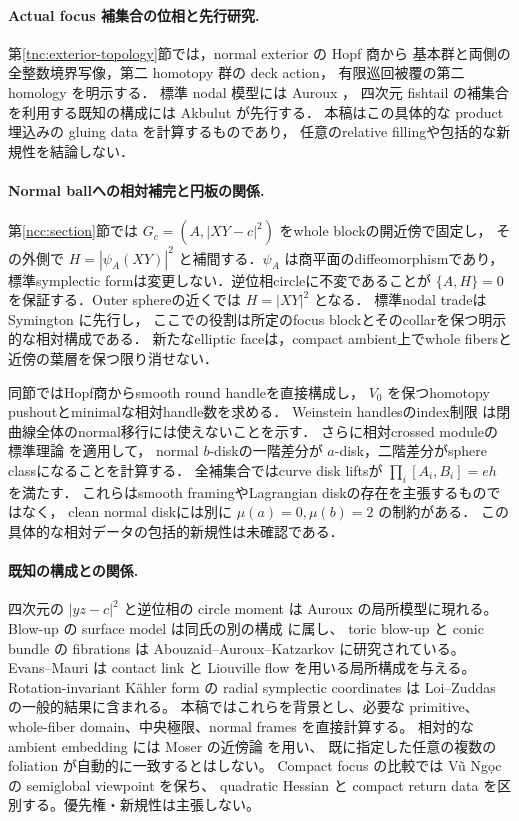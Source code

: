 \documentclass[11pt,a4paper]{article}
\theoremstyle{definition}
\begin{document}
\paragraph{Actual focus 補集合の位相と先行研究.}
第\ref{tnc:exterior-topology}節では，normal exterior の Hopf 商から
基本群と両側の全整数境界写像，第二 homotopy 群の deck action，
有限巡回被覆の第二 homology を明示する．
標準 nodal 模型には Auroux \cite[Section~5.1]{auroux-local}，
四次元 fishtail の補集合を利用する既知の構成には
Akbulut \cite[Introduction]{akbulut-double-fishtail}が先行する．
本稿はこの具体的な product 埋込みの gluing data を計算するものであり，
任意のrelative fillingや包括的な新規性を結論しない．

\paragraph{Normal ballへの相対補完と円板の関係.}
第\ref{ncc:section}節では $G_c=(A,|XY-c|^2)$ をwhole blockの開近傍で固定し，
その外側で $H=|\psi_A(XY)|^2$ と補間する．$\psi_A$ は商平面のdiffeomorphismであり，
標準symplectic formは変更しない．逆位相circleに不変であることが
$\{A,H\}=0$ を保証する．Outer sphereの近くでは $H=|XY|^2$ となる．
標準nodal tradeはSymington \cite[Section~6.1]{symington}に先行し，
ここでの役割は所定のfocus blockとそのcollarを保つ明示的な相対構成である．
新たなelliptic faceは，compact ambient上でwhole fibersと近傍の葉層を保つ限り消せない．

同節ではHopf商からsmooth round handleを直接構成し，
$V_0$ を保つhomotopy pushoutとminimalな相対handle数を求める．
Weinstein handlesのindex制限 \cite[Section~1.1]{cieliebak-eliashberg-flexible-local}
は閉曲線全体のnormal移行には使えないことを示す．
さらに相対crossed moduleの標準理論 \cite[Section~2]{brown-relative-pi2}を適用して，
normal $b$-diskの一階差分が $a$-disk，二階差分がsphere classになることを計算する．
全補集合ではcurve disk liftsが $\prod_i[A_i,B_i]=eh$ を満たす．
これらはsmooth framingやLagrangian diskの存在を主張するものではなく，
clean normal diskには別に $\mu(a)=0,\mu(b)=2$ の制約がある．
この具体的な相対データの包括的新規性は未確認である．

\paragraph{既知の構成との関係.}
四次元の $|yz-c|^2$ と逆位相の circle moment は
Auroux \cite[\S5.1]{auroux-local} の局所模型に現れる。
Blow-up の surface model は同氏の別の構成 \cite[\S3.1.2]{auroux-blowup} に属し、
toric blow-up と conic bundle の fibrations は Abouzaid--Auroux--Katzarkov \cite{aak} に研究されている。
Evans--Mauri \cite{em} は contact link と Liouville flow を用いる局所構成を与える。
Rotation-invariant Kähler form の radial symplectic coordinates は
Loi--Zuddas \cite[Theorem 1.1]{loi-zuddas-local} の一般的結果に含まれる。
本稿ではこれらを背景とし、必要な primitive、whole-fiber domain、中央極限、normal frames を直接計算する。
相対的な ambient embedding には Moser の近傍論 \cite[\S7.3]{cds-local} を用い、
既に指定した任意の複数の foliation が自動的に一致するとはしない。
Compact focus の比較では V\~u Ng\d{o}c \cite{vungoc-local} の semiglobal viewpoint を保ち、
quadratic Hessian と compact return data を区別する。優先権・新規性は主張しない。
\end{document}
